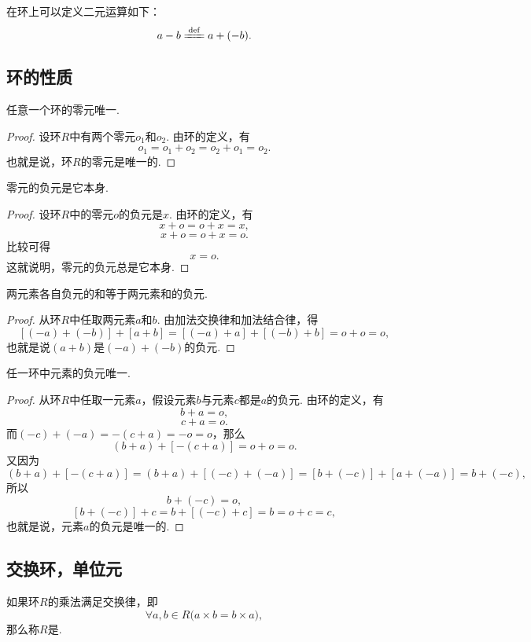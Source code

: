 在环上可以定义二元运算如下：\[
    a - b \defeq a + (-b).
\]

\subsection{环的性质}
\begin{property}
任意一个环的零元唯一.
\begin{proof}
设环\(R\)中有两个零元\(o_1\)和\(o_2\).
由环的定义，有\[
    o_1 = o_1 + o_2 = o_2 + o_1 = o_2.
\]
也就是说，环\(R\)的零元是唯一的.
\end{proof}
\end{property}

\begin{property}
零元的负元是它本身.
\begin{proof}
设环\(R\)中的零元\(o\)的负元是\(x\).
由环的定义，有\[
    x + o = o + x = x,
\]\[
    x + o = o + x = o.
\]比较可得\[
    x = o.
\]
这就说明，零元的负元总是它本身.
\end{proof}
\end{property}

\begin{property}
两元素各自负元的和等于两元素和的负元.
\begin{proof}
从环\(R\)中任取两元素\(a\)和\(b\).
由加法交换律和加法结合律，得\[
    [(-a) + (-b)] + [a + b]
    = [(-a) + a] + [(-b) + b]
    = o + o = o,
\]
也就是说\((a+b)\)是\((-a) + (-b)\)的负元.
\end{proof}
\end{property}

\begin{property}
任一环中元素的负元唯一.
\begin{proof}
从环\(R\)中任取一元素\(a\)，假设元素\(b\)与元素\(c\)都是\(a\)的负元.
由环的定义，有\[
    b + a = o,
\]\[
    c + a = o.
\]
而\((-c) + (-a) = -(c + a) = -o = o\)，那么\[
    (b + a) + [-(c + a)]
    = o + o = o.
\]又因为\[
    (b + a) + [-(c + a)]
    = (b + a) + [(-c) + (-a)]
    = [b + (-c)] + [a + (-a)]
    = b + (-c),
\]所以\[
    b + (-c) = o,
\]\[
    [b + (-c)] + c = b + [(-c) + c] = b = o + c = c,
\]
也就是说，元素\(a\)的负元是唯一的.
\end{proof}
\end{property}

\subsection{交换环，单位元}
\begin{definition}
如果环\(R\)的乘法满足交换律，即\[
    \forall a,b \in R \bigl( a \times b = b \times a \bigr),
\]
那么称\(R\)是.
\end{definition}

